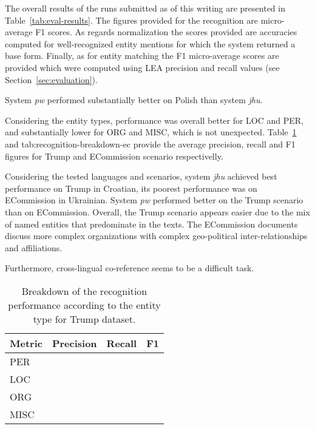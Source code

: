 \documentclass[11pt]{article}
\begin{document}
The overall results of the runs submitted as of this writing are presented in
Table~\ref{tab:eval-results}. The figures provided for the recognition are
micro-average F1 scores. As regards normalization the scores provided are
accuracies computed for well-recognized entity mentions for which the system
returned a base form. Finally, as for entity matching the F1 micro-average scores
are provided which were computed using LEA precision and recall values (see Section~\ref{sec:evaluation}).


System {\em pw} performed substantially better on Polish than system {\em
  jhu}.

Considering the entity types, performance was overall better for LOC and
PER, and substantially lower for ORG and MISC, which is not unexpected. 
Table~\ref{tab:recognition-breakdown-trump} and {tab:recognition-breakdown-ec}
provide the average precision, recall and F1 figures for {\sc Trump} and
{\sc ECommission} scenario respectivelly.

Considering the tested languages and scenarios, system {\em jhu} achieved
best performance on {\sc Trump} in Croatian, its poorest performance was on {\sc ECommission}
in Ukrainian.  System {\em pw} performed better on the {\sc Trump}
scenario than on {\sc ECommission}.  Overall, the {\sc Trump} scenario appears easier
due to the mix of named entities that predominate in the texts.  The {\sc ECommission} documents 
discuss more complex organizations with complex geo-political inter-relationships and affiliations.

Furthermore, cross-lingual co-reference seems to be a difficult task.


\begin{table}
  \begin{center}
    \begin{footnotesize}
      \begin{tabular}{lccc}
        \toprule 
        Metric & \textbf{Precision} & \textbf{Recall} & \textbf{F1} \\
        \midrule
        PER &  &  & \\
        LOC &  & & \\
        ORG &  &  & \\
        MISC & &  &\\
        \bottomrule
      \end{tabular}
    \end{footnotesize}
  \end{center}
  \caption{Breakdown of the recognition performance according to the entity type for {\sc Trump} dataset.}
  \label{tab:recognition-breakdown-trump}
\end{table}
\end{document}
